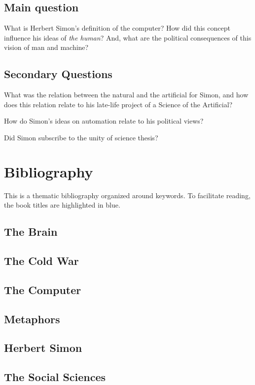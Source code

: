 \documentclass[draft=false, paper=A4,portrait,twoside=true,twocolumn=false,headinclude=false,footinclude=false,fontsize=11,BCOR=15mm,DIV=calc,pagesize=auto,titlepage=firstiscover,mpinclude=true,headings=big,headings=twolinechapter,open=right,chapterprefix=false,headsepline=false,parskip=full]{scrbook}
\begin{document}
\subsection{Main question}
\label{sec:orga8b62aa}
What is Herbert Simon's definition of the computer? How did this
concept influence his ideas of \emph{the human}? And, what are the political
consequences of this vision of man and machine?
\subsection{Secondary Questions}
\label{sec:org5a3edeb}
What was the relation between the natural and the artificial for Simon, and
how does this relation relate to his late-life project of a Science of
the Artificial?

How do Simon's ideas on automation relate to his political views?

Did Simon subscribe to the unity of science thesis?
\section{Bibliography}
\label{sec:orgb03c4c8}
This is a thematic bibliography organized around keywords. To facilitate
reading, the book titles are highlighted in blue. 

\nocite{*}
\subsection{The Brain}
\label{sec:orgf27d9e8}
\printbibliography[heading=none,keyword=memoire,keyword=brain]
\subsection{The Cold War}
\label{sec:org522528d}
\printbibliography[heading=none,keyword=memoire,keyword=cold-war,notkeyword=brain]
\subsection{The Computer}
\label{sec:org765984a}
\printbibliography[heading=none,keyword=memoire,keyword=computer,notkeyword=brain,notkeyword=cold-war]
\subsection{Metaphors}
\label{sec:org20d02c0}
\printbibliography[heading=none,keyword=memoire,keyword=metaphors,notkeyword=brain,notkeyword=cold-war,notkeyword=computer,notkeyword=cyborg]
\subsection{Herbert Simon}
\label{sec:org4923ad7}
\printbibliography[heading=none,keyword=memoire,keyword=herbert-simon,notkeyword=brain,notkeyword=cold-war,notkeyword=computer,notkeyword=cyborg,notkeyword=metaphors]
\subsection{The Social Sciences}
\label{sec:org9da67eb}
\printbibliography[heading=none,keyword=memoire,keyword=social-science,notkeyword=brain,notkeyword=computer,notkeyword=cyborg,notkeyword=metaphors,notkeyword=herbert-simon,notkeyword=cold-war]
\end{document}
